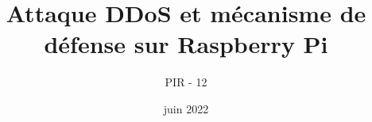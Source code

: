 \documentclass{article}
\begin{document}
\title{Attaque DDoS et mécanisme de défense sur Raspberry Pi}
\author{PIR - 12 }
\date{juin 2022}
\maketitle
\begin{multicols}{2}

\end{multicols}
\end{document}
